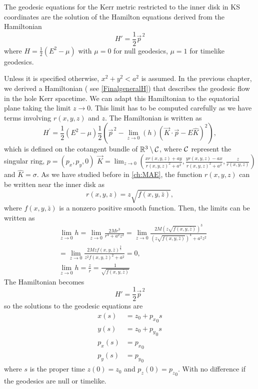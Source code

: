 \begin{theorem}\label{Th:ep}
 The geodesic equations for the Kerr metric restricted to the inner disk in \gls{KS} coordinates are the solution of the Hamilton equations derived from the Hamiltonian
 \begin{equation}
 H'=\frac{1}{2}  \vec{p}^{\,2}
\end{equation}
where $H=\frac{1}{2}(E^2-\mu)$ with $\mu=0$ for null geodesics, $\mu=1$ for timelike geodesics.
\end{theorem}
\begin{Proof}
Unless it is specified otherwise, $x^2+y^2<a^2$ is assumed. In the previous chapter, we derived a Hamiltonian ( see \cref{FinalgeneralH}) that describes the geodesic flow in the hole Kerr spacetime. We can adapt this Hamiltonian to the equatorial plane taking the limit $z \to 0$. This limit has to be computed carefully as we have terms involving $r(x,y,z)$ and $z$. The Hamiltonian is written as
\begin{equation}\label{Hamiltoniandisk}
H^{\prime}= \frac{1}{2}\left(E^2-\mu \right)
\frac{1}{2} \left( \vec{p}^{\,2}- \lim_{z \to 0}{(h)} \left( \vec{K} \cdot \vec{p} - E 
\hat{K} \right)^2 \right),
\end{equation} 
which is defined on the cotangent bundle of $\mathbb{R}^{3} \setminus {\mathcal C}$, where ${\mathcal C}$ represent the singular ring, $p=\left(p_x,p_y,0\right)$ $\vec{K}=\lim_{z \to 0}\left(\frac{x r(x,y,z)+a y}{r(x,y,z)^2+a^2},\frac{y r(x,y,z)-a x}{r(x,y,z)^2+a^2}, {\frac{z}{r(x,y,z)}}\right)$ and $\hat{K}=\sigma$. As we have studied before in \cref{ch:MAE}, the function $r(x,y,z)$ can be written near the inner disk as
 \begin{equation}
  r(x,y,z)=z \sqrt{f(x,y,\bar{z})},
 \end{equation}
 where $f(x,y,\bar{z})$ is a nonzero positive smooth function. Then, the limits can be written as
 \begin{align}
  &\lim_{z \to 0}{h}=  \lim_{z \to 0}{\frac{2 M r^3}{r^4+a^2 z^2}} =\lim_{z \to 0}{\frac{2 M (z \sqrt{f(x,y,\bar{z})})^3}{(z \sqrt{f(x,y,\bar{z})})^4+a^2 z^2}}\\
  &= \lim_{z \to 0}{\frac{2 M z f(x,y,\bar{z})^\frac{3}{2}}{ z^2 f(x,y,\bar{z})^2+a^2}}= 0,\\
  &\lim_{z \to 0}{h}=\frac{z}{r}=\frac{1}{\sqrt{f(x,y,\bar{z})}}
 \end{align}
The Hamiltonian becomes
\begin{equation}
 H'=\frac{1}{2}  \vec{p}^{\,2}
\end{equation}
so the solutions to the geodesic equations are
\begin{align}
 x(s)&=z_0 +{p_x}_0 s \\
 y(s)&=z_0 +{p_y}_0 s \\
 p_x(s)&={p_x}_0\\
 p_y(s)&={p_y}_0
\end{align}
where $s$ is the proper time $z(0)=z_0$ and $p_z(0)={p_z}_0$. With no difference if the geodesics are null or timelike.\end{Proof}

